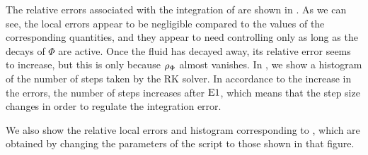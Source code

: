 \documentclass[11pt,a4paper]{article}
\begin{document}
%
The relative errors associated with the integration of  are shown in . As we can see, the local errors appear to be negligible compared to the values of the corresponding quantities, and they appear to need controlling only as long as the decays of $\Phi$ are active. Once the fluid has decayed away, its relative error seems to increase, but this is only because $\rho_{\Phi}$ almost vanishes.
%
In , we show a histogram of the number of steps taken by the RK solver. In accordance to the increase in the errors, the number of steps increases after ${\rm E1}{}$, which means that the step size changes in order to regulate the integration error.

We also show the relative local errors and histogram corresponding to , which are obtained by changing the parameters of the script to those shown in that figure.   
%
\end{document}

